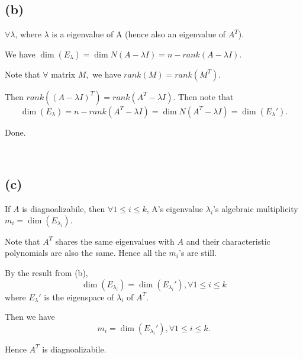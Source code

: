 \documentclass[12pt]{article}%
\begin{document}
\subsection{(b)}
$\forall \lambda$, where $\lambda$ is a eigenvalue of A (hence also an eigenvalue of $A^{T}$).

We have $\dim{(E_\lambda)}=\dim{N(A-\lambda I)}=n-rank(A-\lambda I).$ 

Note that $\forall $ matrix $M,$ we have $rank(M)=rank(M^{T}).$

Then $rank((A-\lambda I)^{T})=rank(A^{T}-\lambda I).$ Then note that $$\dim{(E_\lambda)}=n-rank(A^{T}-\lambda I)=\dim{N(A^{T}-\lambda I)}=\dim{(E_{\lambda}')}.$$

Done.

~\ 

\subsection{(c)}
If $A$ is diagnoalizabile, then $\forall 1\leq i \leq k$, A's eigenvalue $\lambda_i$'s algebraic multiplicity $m_i=\dim{(E_{\lambda_i})}.$

Note that $A^{T}$ shares the same eigenvalues with $A$ and their characteristic polynomials are also the same. Hence all the $m_i$'s are still.

By the result from (b), $$\dim{(E_{\lambda_i})}=\dim{(E_{\lambda_i}')}, \forall 1\leq i \leq k$$ where $E_{\lambda}'$ is the eigenspace of $\lambda_i$ of $A^{T}.$

Then we have $$m_i=\dim{(E_{\lambda_i}')}, \forall 1\leq i \leq k.$$

Hence $A^{T}$ is diagnoalizabile.
\end{document}
